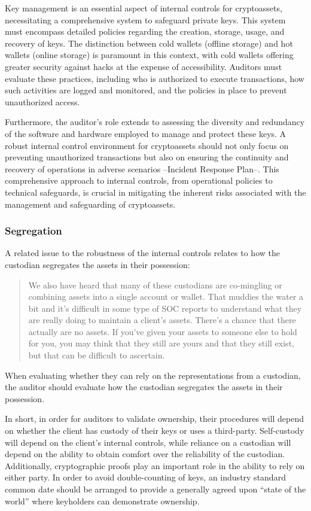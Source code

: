 Key management is an essential aspect of internal controls for cryptoassets, necessitating a comprehensive system to safeguard private keys. This system must encompass detailed policies regarding the creation, storage, usage, and recovery of keys. The distinction between cold wallets (offline storage) and hot wallets (online storage) is paramount in this context, with cold wallets offering greater security against hacks at the expense of accessibility. Auditors must evaluate these practices, including who is authorized to execute transactions, how such activities are logged and monitored, and the policies in place to prevent unauthorized access.

Furthermore, the auditor's role extends to assessing the diversity and redundancy of the software and hardware employed to manage and protect these keys. A robust internal control environment for cryptoassets should not only focus on preventing unauthorized transactions but also on ensuring the continuity and recovery of operations in adverse scenarios --Incident Response Plan--. This comprehensive approach to internal controls, from operational policies to technical safeguards, is crucial in mitigating the inherent risks associated with the management and safeguarding of cryptoassets.


\subsubsection{Segregation}

A related issue to the robustness of the internal controls relates to how the custodian segregates the assets in their possession: 

\begin{quote}
We also have heard that many of these custodians are co-mingling or combining assets into a single account or wallet. That muddies the water a bit and it's difficult in some type of SOC reports to understand what they are really doing to maintain a client's assets. There's a chance that there actually are no assets. If you've given your assets to someone else to hold for you, you may think that they still are yours and that they still exist, but that can be difficult to ascertain.
\end{quote}

When evaluating whether they can rely on the representations from a custodian, the auditor should evaluate how the custodian segregates the assets in their possession. 

In short, in order for auditors to validate ownership, their procedures will depend on whether the client has custody of their keys or uses a third-party. Self-custody will depend on the client's internal controls, while reliance on a custodian will depend on the ability to obtain comfort over the reliability of the custodian. Additionally, cryptographic proofs play an important role in the ability to rely on either party. In order to avoid double-counting of keys, an industry standard common date should be arranged to provide a generally agreed upon ``state of the world'' where keyholders can demonstrate ownership. 

